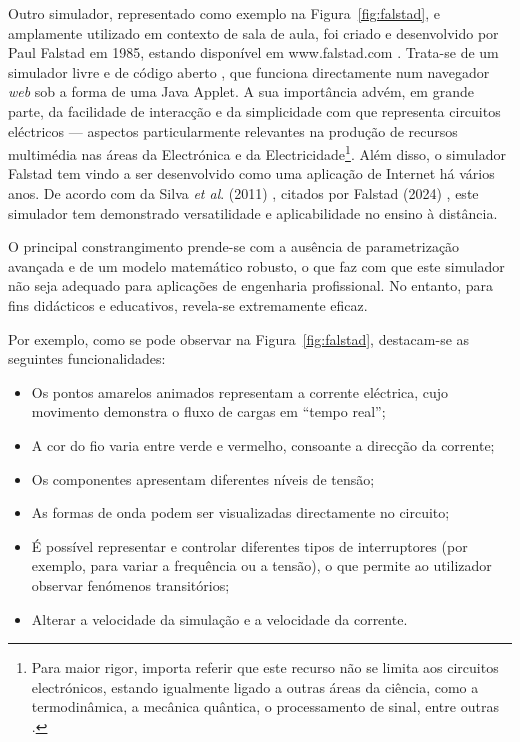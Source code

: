 Outro simulador, representado como exemplo na Figura~\ref{fig:falstad}, e amplamente utilizado em contexto de sala de aula, foi criado e desenvolvido por Paul Falstad em 1985, estando disponível em www.falstad.com \cite{falstad}. Trata-se de um simulador livre e de código aberto \cite{falstadlicenca}, que funciona directamente num navegador \textit{web} sob a forma de uma Java Applet. A sua importância advém, em grande parte, da facilidade de interacção e da simplicidade com que representa circuitos eléctricos — aspectos particularmente relevantes na produção de recursos multimédia nas áreas da Electrónica e da Electricidade\footnote{Para maior rigor, importa referir que este recurso não se limita aos circuitos electrónicos, estando igualmente ligado a outras áreas da ciência, como a termodinâmica, a mecânica quântica, o processamento de sinal, entre outras \cite{falstadcompleto}.}. Além disso, o simulador Falstad tem vindo a ser desenvolvido como uma aplicação de Internet há vários anos. De acordo com da Silva \textit{et al}. (2011) \cite{RemoteTeachingElectricalCircuits}, citados por Falstad (2024) \cite{falstad}, este simulador tem demonstrado versatilidade e aplicabilidade no ensino à distância.

O principal constrangimento prende-se com a ausência de parametrização avançada e de um modelo matemático robusto, o que faz com que este simulador não seja adequado para aplicações de engenharia profissional. No entanto, para fins didácticos e educativos, revela-se extremamente eficaz.

Por exemplo, como se pode observar na Figura~\ref{fig:falstad}, destacam-se as seguintes funcionalidades:

\begin{itemize}
    \item Os pontos amarelos animados representam a corrente eléctrica, cujo movimento demonstra o fluxo de cargas em ``tempo real'';
    \item A cor do fio varia entre verde e vermelho, consoante a direcção da corrente;
    \item Os componentes apresentam diferentes níveis de tensão;
    \item As formas de onda podem ser visualizadas directamente no circuito;
    \item É possível representar e controlar diferentes tipos de interruptores (por exemplo, para variar a frequência ou a tensão), o que permite ao utilizador observar fenómenos transitórios;
    \item Alterar a velocidade da simulação e a velocidade da corrente.
\end{itemize}

